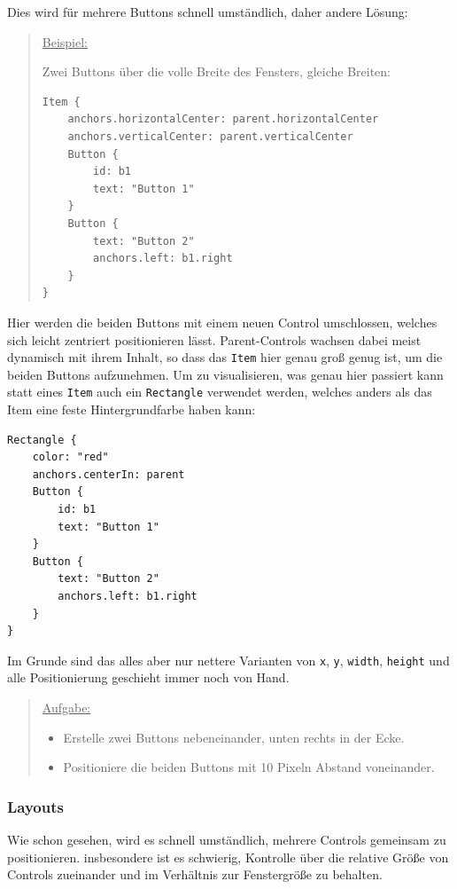 \documentclass[a4paper]{article}
\begin{document}
Dies wird für mehrere Buttons schnell umständlich, daher andere Lösung:

\begin{quote}
\uline{Beispiel:}

Zwei Buttons über die volle Breite des Fensters, gleiche Breiten:
\begin{verbatim}
Item {
    anchors.horizontalCenter: parent.horizontalCenter
    anchors.verticalCenter: parent.verticalCenter
    Button {
        id: b1
        text: "Button 1"
    }
    Button {
        text: "Button 2"
        anchors.left: b1.right
    }
}
\end{verbatim}
\end{quote}

Hier werden die beiden Buttons mit einem neuen Control umschlossen, welches sich leicht zentriert positionieren lässt. Parent-Controls wachsen dabei meist dynamisch mit ihrem Inhalt, so dass das \verb~Item~ hier genau groß genug ist, um die beiden Buttons aufzunehmen.
Um zu visualisieren, was genau hier passiert kann statt eines \verb~Item~ auch ein \verb~Rectangle~ verwendet werden, welches anders als das Item eine feste Hintergrundfarbe haben kann:

\begin{verbatim}
Rectangle {
    color: "red"
    anchors.centerIn: parent
    Button {
        id: b1
        text: "Button 1"
    }
    Button {
        text: "Button 2"
        anchors.left: b1.right
    }
}
\end{verbatim}

Im Grunde sind das alles aber nur nettere Varianten von \verb~x~, \verb~y~, \verb~width~, \verb~height~ und alle Positionierung geschieht immer noch von Hand.

\begin{quote}
\uline{Aufgabe:}
\begin{itemize}
\item Erstelle zwei Buttons nebeneinander, unten rechts in der Ecke.
\item Positioniere die beiden Buttons mit 10 Pixeln Abstand voneinander.
\end{itemize}
\end{quote}
\subsubsection{Layouts}
\label{sec-1-2-4}
Wie schon gesehen, wird es schnell umständlich, mehrere Controls gemeinsam zu positionieren. insbesondere ist es schwierig, Kontrolle über die relative Größe von Controls zueinander und im Verhältnis zur Fenstergröße zu behalten.
\end{document}
